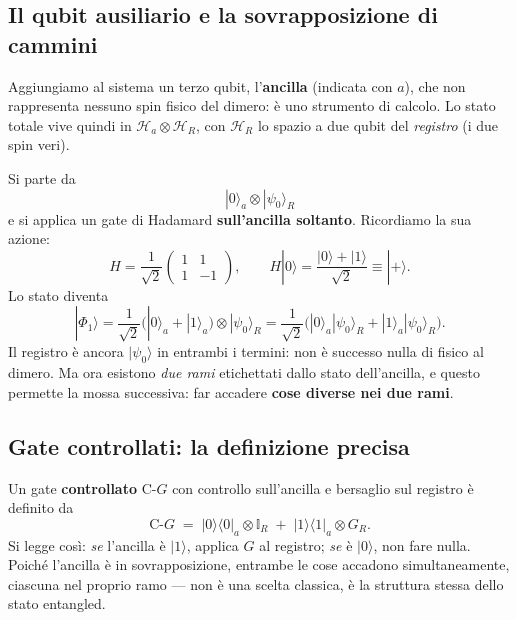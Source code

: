 \documentclass[11pt,a4paper]{article}
\begin{document}

\subsection{Il qubit ausiliario e la sovrapposizione di cammini}

Aggiungiamo al sistema un terzo qubit, l'\textbf{ancilla} (indicata con $a$), che non rappresenta
nessuno spin fisico del dimero: è uno strumento di calcolo. Lo stato totale vive quindi in
$\mathcal H_a\otimes\mathcal H_R$, con $\mathcal H_R$ lo spazio a due qubit del \emph{registro}
(i due spin veri).

Si parte da
\begin{equation}
|0\rangle_a\otimes|\psi_0\rangle_R
\end{equation}
e si applica un gate di Hadamard \textbf{sull'ancilla soltanto}. Ricordiamo la sua azione:
\begin{equation}
H=\frac{1}{\sqrt2}\begin{pmatrix}1&1\\1&-1\end{pmatrix},
\qquad H|0\rangle=\frac{|0\rangle+|1\rangle}{\sqrt2}\equiv|+\rangle .
\end{equation}
Lo stato diventa
\begin{equation}
|\Phi_1\rangle=\frac{1}{\sqrt2}\Big(|0\rangle_a+|1\rangle_a\Big)\otimes|\psi_0\rangle_R
=\frac{1}{\sqrt2}\Big(|0\rangle_a|\psi_0\rangle_R+|1\rangle_a|\psi_0\rangle_R\Big).
\end{equation}
Il registro è ancora $|\psi_0\rangle$ in entrambi i termini: non è successo nulla di fisico al
dimero. Ma ora esistono \emph{due rami} etichettati dallo stato dell'ancilla, e questo permette
la mossa successiva: far accadere \textbf{cose diverse nei due rami}.

\subsection{Gate controllati: la definizione precisa}

Un gate \textbf{controllato} $\mathrm{C}\text{-}G$ con controllo sull'ancilla e bersaglio sul
registro è definito da
\begin{equation}
\mathrm{C}\text{-}G \;=\; |0\rangle\langle0|_a\otimes\mathbb{I}_R \;+\; |1\rangle\langle1|_a\otimes G_R .
\label{eq:ctrl}
\end{equation}
Si legge così: \emph{se} l'ancilla è $|1\rangle$, applica $G$ al registro; \emph{se} è
$|0\rangle$, non fare nulla. Poiché l'ancilla è in sovrapposizione, entrambe le cose accadono
simultaneamente, ciascuna nel proprio ramo --- non è una scelta classica, è la struttura stessa
dello stato entangled.
\end{document}
